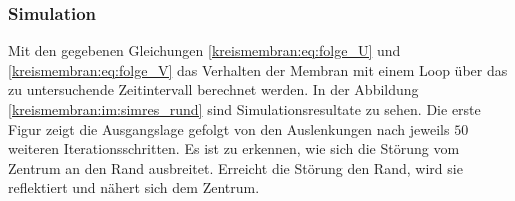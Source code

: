 \subsubsection{Simulation}
Mit den gegebenen Gleichungen \eqref{kreismembran:eq:folge_U} und \eqref{kreismembran:eq:folge_V} das Verhalten der Membran mit einem Loop über das zu untersuchende Zeitintervall berechnet werden. 
In der Abbildung \ref{kreismembran:im:simres_rund} sind Simulationsresultate zu sehen.
Die erste Figur zeigt die Ausgangslage gefolgt von den Auslenkungen nach jeweils $ 50 $ weiteren Iterationsschritten.
Es ist zu erkennen, wie sich die Störung vom Zentrum an den Rand ausbreitet.
Erreicht die Störung den Rand, wird sie reflektiert und nähert sich dem Zentrum. 
\begin{figure}
	
	\begin{center}
		

\end{center}
\end{figure}
